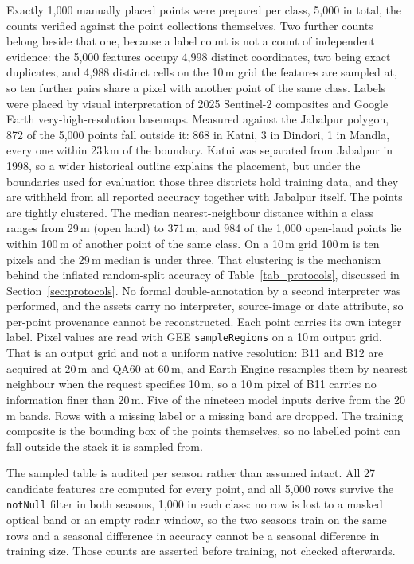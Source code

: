 \documentclass[conference]{IEEEtran}
\begin{document}
Exactly 1,000 manually placed points were prepared per class, 5,000 in total, the counts verified against the point collections themselves. Two further counts belong beside that one, because a label count is not a count of independent evidence: the 5,000 features occupy 4,998 distinct coordinates, two being exact duplicates, and 4,988 distinct cells on the 10\,m grid the features are sampled at, so ten further pairs share a pixel with another point of the same class. Labels were placed by visual interpretation of 2025 Sentinel-2 composites and Google Earth very-high-resolution basemaps. Measured against the Jabalpur polygon, 872 of the 5,000 points fall outside it: 868 in Katni, 3 in Dindori, 1 in Mandla, every one within 23\,km of the boundary. Katni was separated from Jabalpur in 1998, so a wider historical outline explains the placement, but under the boundaries used for evaluation those three districts hold training data, and they are withheld from all reported accuracy together with Jabalpur itself. The points are tightly clustered. The median nearest-neighbour distance within a class ranges from 29\,m (open land) to 371\,m, and 984 of the 1,000 open-land points lie within 100\,m of another point of the same class. On a 10\,m grid 100\,m is ten pixels and the 29\,m median is under three. That clustering is the mechanism behind the inflated random-split accuracy of Table~\ref{tab_protocols}, discussed in Section~\ref{sec:protocols}. No formal double-annotation by a second interpreter was performed, and the assets carry no interpreter, source-image or date attribute, so per-point provenance cannot be reconstructed. Each point carries its own integer label. Pixel values are read with GEE \texttt{sampleRegions} on a 10\,m output grid. That is an output grid and not a uniform native resolution: B11 and B12 are acquired at 20\,m and QA60 at 60\,m, and Earth Engine resamples them by nearest neighbour when the request specifies 10\,m, so a 10\,m pixel of B11 carries no information finer than 20\,m. Five of the nineteen model inputs derive from the 20\,m bands. Rows with a missing label or a missing band are dropped. The training composite is the bounding box of the points themselves, so no labelled point can fall outside the stack it is sampled from.

The sampled table is audited per season rather than assumed intact. All 27 candidate features are computed for every point, and all 5,000 rows survive the \texttt{notNull} filter in both seasons, 1,000 in each class: no row is lost to a masked optical band or an empty radar window, so the two seasons train on the same rows and a seasonal difference in accuracy cannot be a seasonal difference in training size. Those counts are asserted before training, not checked afterwards.
\end{document}
